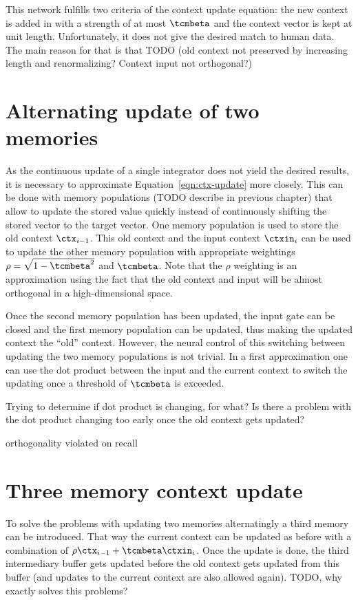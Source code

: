 This network fulfills two criteria of the context update equation: the new context is added in with a strength of at most $\tcmbeta$ and the context vector is kept at unit length.
Unfortunately, it does not give the desired match to human data.
The main reason for that is that TODO (old context not preserved by increasing length and renormalizing? Context input not orthogonal?)

\section{Alternating update of two memories}
As the continuous update of a single integrator does not yield the desired results, it is necessary to approximate Equation~\ref{eqn:ctx-update} more closely.
This can be done with memory populations (TODO describe in previous chapter) that allow to update the stored value quickly instead of continuously shifting the stored vector to the target vector.
One memory population is used to store the old context $\ctx_{i-1}$.
This old context and the input context $\ctxin_i$ can be used to update the other memory population with appropriate weightings $\rho = \sqrt{1 - \tcmbeta^2}$ and $\tcmbeta$.
Note that the $\rho$ weighting is an approximation using the fact that the old context and input will be almost orthogonal in a high-dimensional space.

Once the second memory population has been updated, the input gate can be closed and the first memory population can be updated, thus making the updated context the ``old'' context.
However, the neural control of this switching between updating the two memory populations is not trivial.
In a first approximation one can use the dot product between the input and the current context to switch the updating once a threshold of $\tcmbeta$ is exceeded.

Trying to determine if dot product is changing, for what?
Is there a problem with the dot product changing too early once the old context gets updated?

orthogonality violated on recall

\section{Three memory context update}
To solve the problems with updating two memories alternatingly a third memory can be introduced.
That way the current context can be updated as before with a combination of $\rho \ctx_{i-1} + \tcmbeta \ctxin_i$.
Once the update is done, the third intermediary buffer gets updated before the old context gets updated from this buffer (and updates to the current context are also allowed again). TODO, why exactly solves this problems?

